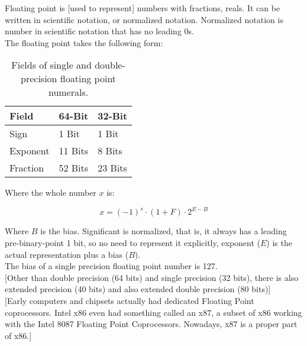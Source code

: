 \documentclass[11pt,a4paper,twocolumn]{book}
\begin{document}
Floating point is [used to represent] numbers with fractions, reals. It can be written in scientific notation, or normalized notation. Normalized notation is number in scientific notation that has no leading 0s.\\

The floating point takes the following form:

\begin{table}
\begin{tabular}{lll}
Field & 64-Bit & 32-Bit\\
\toprule
Sign & 1 Bit & 1 Bit\\
Exponent & 11 Bits & 8 Bits\\
Fraction & 52 Bits & 23 Bits\\
\bottomrule
\end{tabular}
\caption{Fields of single and double-precision floating point numerals.}
\end{table}


Where the whole number $x$ is:

\begin{equation}
x = (-1)^s \cdot (1 + F) \cdot 2^{E - B}
\end{equation}

Where $B$ is the bias. Significant is normalized, that is, it always has a leading pre-binary-point 1 bit, so no need to represent it explicitly, exponent ($E$) is the actual representation plus a bias ($B$).\\

The bias of a single precision floating point number is 127.\\

[Other than double precision (64 bits) and single precision (32 bits), there is also extended precision (40 bits) and also extended double precision (80 bits)]\\

[Early computers and chipsets actually had dedicated Floating Point coprocessors. Intel x86 even had something called an x87, a subset of x86 working with the Intel 8087 Floating Point Coprocessors. Nowadays, x87 is a proper part of x86.]
\end{document}
